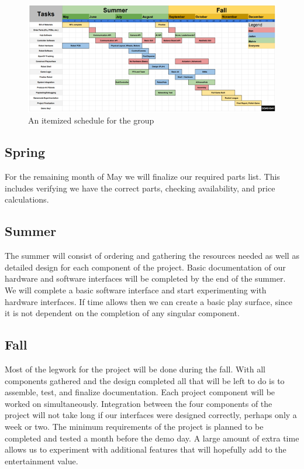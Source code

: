 \documentclass[11pt]{ieeeconf}
\begin{document}
 \begin{figure}[!t]
  \centering
  \captionsetup{justification=centering}
      \includegraphics[width=\textwidth]{images/schedule.png}
        \caption{An itemized schedule for the group}
        \label{schedule}
\end{figure}

\subsection{Spring}
For the remaining month of May we will finalize our required parts list. This includes verifying we have the correct parts, checking availability, and price calculations. 

\subsection{Summer}
The summer will consist of ordering and gathering the resources needed as well as detailed design for each component of the project. Basic documentation of our hardware and software interfaces will be completed by the end of the summer. We will complete a basic software interface and start experimenting with hardware interfaces. If time allows then we can create a basic play surface, since it is not dependent on the completion of any singular component.

\subsection{Fall}
Most of the legwork for the project will be done during the fall. With all components gathered and the design completed all that will be left to do is to assemble, test, and finalize documentation. Each project component will be worked on simultaneously. Integration between the four components of the project will not take long if our interfaces were designed correctly, perhaps only a week or two. The minimum requirements of the project is planned to be completed and tested a month before the demo day. A large amount of extra time allows us to experiment with additional features that will hopefully add to the entertainment value.
\end{document}
